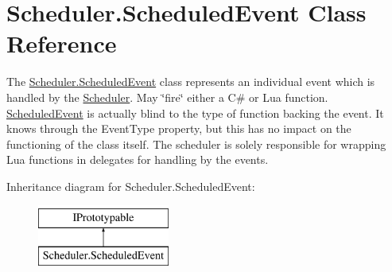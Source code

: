 \hypertarget{class_scheduler_1_1_scheduled_event}{}\section{Scheduler.\+Scheduled\+Event Class Reference}
\label{class_scheduler_1_1_scheduled_event}


The \hyperlink{class_scheduler_1_1_scheduled_event}{Scheduler.\+Scheduled\+Event} class represents an individual event which is handled by the \hyperlink{class_scheduler_1_1_scheduler}{Scheduler}. May \char`\"{}fire\char`\"{} either a C\# or Lua function. \hyperlink{class_scheduler_1_1_scheduled_event}{Scheduled\+Event} is actually blind to the type of function backing the event. It knows through the Event\+Type property, but this has no impact on the functioning of the class itself. The scheduler is solely responsible for wrapping Lua functions in delegates for handling by the events.  


Inheritance diagram for Scheduler.\+Scheduled\+Event\+:\begin{figure}[H]
\begin{center}
\leavevmode
\includegraphics[height=2.000000cm]{class_scheduler_1_1_scheduled_event}
\end{center}
\end{figure}
